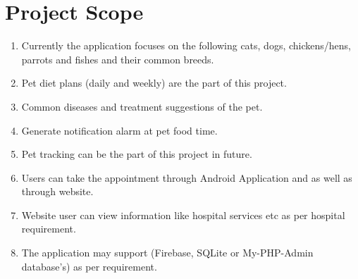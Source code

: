 \section{Project Scope}
\begin{enumerate}
\item	Currently the application focuses on the following cats, dogs, chickens/hens, parrots and fishes and their common breeds.
\item Pet diet plans (daily and weekly) are the part of this project.
\item Common diseases and treatment suggestions of the pet.
\item Generate notification alarm at pet food time.
\item Pet tracking can be the part of this project in future.
\item Users can take the appointment through Android Application and as well as through website\cite{wpage01}.
\item Website user can view information like hospital services etc as per hospital requirement.
\item The application may support (Firebase, SQLite or My-PHP-Admin database’s) as per requirement\cite{caps}.
\end{enumerate}

